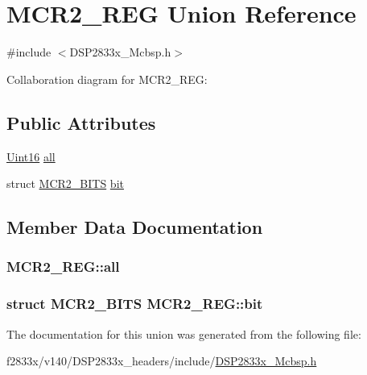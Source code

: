 \hypertarget{union_m_c_r2___r_e_g}{}\section{M\+C\+R2\+\_\+\+R\+E\+G Union Reference}
\label{union_m_c_r2___r_e_g}


{\ttfamily \#include $<$D\+S\+P2833x\+\_\+\+Mcbsp.\+h$>$}



Collaboration diagram for M\+C\+R2\+\_\+\+R\+E\+G\+:
\subsection*{Public Attributes}
\begin{DoxyCompactItemize}
\item 
\hyperlink{_d_s_p2833x___device_8h_a59a9f6be4562c327cbfb4f7e8e18f08b}{Uint16} \hyperlink{union_m_c_r2___r_e_g_a60f7cfa70dd7106d4a6fcec891140035}{all}
\item 
struct \hyperlink{struct_m_c_r2___b_i_t_s}{M\+C\+R2\+\_\+\+B\+I\+T\+S} \hyperlink{union_m_c_r2___r_e_g_acabf7c1a5b7eea5d9551840bf6470e8a}{bit}
\end{DoxyCompactItemize}


\subsection{Member Data Documentation}
\hypertarget{union_m_c_r2___r_e_g_a60f7cfa70dd7106d4a6fcec891140035}{}
\subsubsection[{all}]{ M\+C\+R2\+\_\+\+R\+E\+G\+::all}\label{union_m_c_r2___r_e_g_a60f7cfa70dd7106d4a6fcec891140035}
\hypertarget{union_m_c_r2___r_e_g_acabf7c1a5b7eea5d9551840bf6470e8a}{}
\subsubsection[{bit}]{\setlength{\rightskip}{0pt plus 5cm}struct {\bf M\+C\+R2\+\_\+\+B\+I\+T\+S} M\+C\+R2\+\_\+\+R\+E\+G\+::bit}\label{union_m_c_r2___r_e_g_acabf7c1a5b7eea5d9551840bf6470e8a}


The documentation for this union was generated from the following file\+:\begin{DoxyCompactItemize}
\item 
f2833x/v140/\+D\+S\+P2833x\+\_\+headers/include/\hyperlink{_d_s_p2833x___mcbsp_8h}{D\+S\+P2833x\+\_\+\+Mcbsp.\+h}\end{DoxyCompactItemize}
